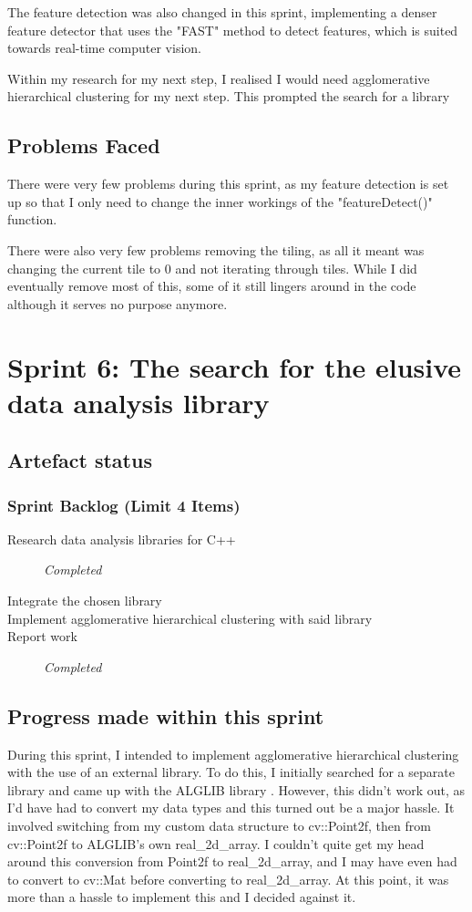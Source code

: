 The feature detection was also changed in this sprint, implementing a denser feature detector that uses the "FAST" method to detect features, which is suited towards real-time computer vision. 

Within my research for my next step, I realised I would need agglomerative hierarchical clustering for my next step. This prompted the search for a library 

\subsection{Problems Faced}
There were very few problems during this sprint, as my feature detection is set up so that I only need to change the inner workings of the "featureDetect()" function.

There were also very few problems removing the tiling, as all it meant was changing the current tile to 0 and not iterating through tiles. While I did eventually remove most of this, some of it still lingers around in the code although it serves no purpose anymore. 
\clearpage
\section{Sprint 6: The search for the elusive data analysis library}
\subsection{Artefact status}
\subsubsection{Sprint Backlog (Limit 4 Items)}
\begin{description}
  \item[Research data analysis libraries for C++] \em{Completed}
  \item[Integrate the chosen library] 
  \item[Implement agglomerative hierarchical clustering with said library]
  \item[Report work] \em{Completed}
\end{description}
\subsection{Progress made within this sprint}
During this sprint, I intended to implement agglomerative hierarchical clustering with the use of an external library. To do this, I initially searched for a separate library and came up with the ALGLIB library \cite{ALGLIB}. However, this didn't work out, as I'd have had to convert my data types and this turned out be a major hassle. It involved switching from my custom data structure to cv::Point2f, then from cv::Point2f to ALGLIB's own real\_2d\_array. I couldn't quite get my head around this conversion from Point2f to real\_2d\_array, and I may have even had to convert to cv::Mat before converting to real\_2d\_array. At this point, it was more than a hassle to implement this and I decided against it.

